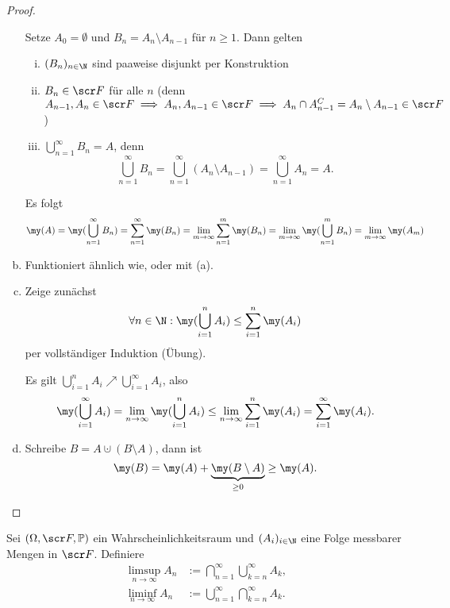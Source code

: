 \begin{lem}
\begin{proof}
\begin{enumerate}[(a)]
				Setze $A_0 = \emptyset$ und $B_n = A_n \setminus A_{n-1}$ für $n \ge 1$.
				Dann gelten
				\begin{enumerate}[(i)]
					\item
						$(B_n)_{n\in\N}$ sind paaweise disjunkt per Konstruktion
					\item
						$B_n \in \scr F$ für alle $n$ (denn $A_{n-1},A_n \in \scr F \implies A_n, A_{n-1} \in \scr F \implies A_n \cap A_{n-1}^C = A_n \setminus A_{n-1} \in \scr F$)
					\item
						$\bigcup_{n=1}^\infty B_n = A$, denn
						\[
							\bigcup_{n=1}^\infty B_n = \bigcup_{n=1}^\infty (A_n \setminus A_{n-1}) = \bigcup_{n=1}^\infty A_n = A.
						\]
				\end{enumerate}
				Es folgt
				\[
					\my(A)
					= \my(\bigcup_{n=1}^\infty B_n)
					= \sum_{n=1}^\infty \my(B_n)
					= \lim_{m\to\infty} \sum_{n=1}^m \my(B_n)
					= \lim_{m\to \infty} \my(\bigcup_{n=1}^m B_n)
					= \lim_{m\to \infty} \my(A_m)
				\]
			\item
				Funktioniert ähnlich wie, oder mit (a).
			\item
				Zeige zunächst
				\[
					\forall n \in \N : \my(\bigcup_{i=1}^n A_i) \le \sum_{i=1}^n \my(A_i)
				\]
				per vollständiger Induktion (Übung).

				Es gilt $\bigcup_{i=1}^n A_i \nearrow \bigcup_{i=1}^\infty A_i$, also
				\[
					\my(\bigcup_{i=1}^\infty A_i)
					= \lim_{n\to \infty} \my(\bigcup_{i=1}^n A_i)
					\le \lim_{n\to \infty} \sum_{i=1}^n \my(A_i)
					= \sum_{i=1}^\infty \my (A_i).
				\]
			\item
				Schreibe $B = A \cupdot (B \setminus A)$, dann ist
				\[
					\my(B) = \my(A) + \underbrace{\my(B\setminus A)}_{\ge 0} \ge \my(A).
				\]
		\end{enumerate}
	\end{proof}
\end{lem}

\begin{df} \label{1.1.11}
	Sei $(\Omega, \scr F, \P)$ ein Wahrscheinlichkeitsraum und $(A_i)_{i\in\N}$ eine Folge messbarer Mengen in $\scr F$.
	Definiere
	\begin{align*}
		\limsup_{n\to\infty} A_n
			&:= \bigcap_{n=1}^\infty \bigcup_{k=n}^\infty A_k, \\
		\liminf_{n\to\infty} A_n
			&:= \bigcup_{n=1}^\infty \bigcap_{k=n}^\infty A_k.
	\end{align*}
\end{df}

